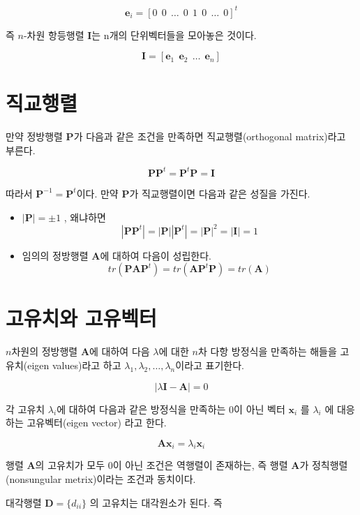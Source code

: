 \documentclass[
]{book}
\theoremstyle{definition}
\theoremstyle{definition}
\theoremstyle{definition}
\theoremstyle{remark}
\begin{document}
\[ \bm e_i = [0 ~~0 ~~\dots~~ 0 ~~ 1 ~~ 0 ~~ \dots ~~ 0 ]^t \]

즉 \(n\)-차원 항등행렬 \(\bm I\)는 n개의 단위벡터들을 모아놓은 것이다.

\[  \bm I = [ \bm e_1 ~~ \bm e_2 ~~ \dots ~~ \bm e_n ] \]

\hypertarget{uxc9c1uxad50uxd589uxb82c}{%
\section{직교행렬}\label{uxc9c1uxad50uxd589uxb82c}}

만약 정방행렬 \(\bm P\)가 다음과 같은 조건을 만족하면 직교행렬(orthogonal matrix)라고 부른다.

\[  \bm P \bm P^t = \bm P^t \bm P = \bm I \]

따라서 \(\bm P^{-1} = \bm P^t\)이다. 만약 \(\bm P\)가 직교행렬이면 다음과 같은 성질을 가진다.

\begin{itemize}
\item
  \(| \bm P | = \pm 1\) , 왜냐하면
  \[  | \bm P \bm P^t | = | \bm P | |\bm P^t |  = | \bm P|^2 = |\bm I| =1 \]
\item
  임의의 정방행렬 \(\bm A\)에 대하여 다음이 성립한다.
  \[ tr(\bm P \bm A \bm P^t) = tr(\bm A \bm P^t \bm P) = tr(\bm A) \]
\end{itemize}

\hypertarget{uxace0uxc720uxce58uxc640-uxace0uxc720uxbca1uxd130}{%
\section{고유치와 고유벡터}\label{uxace0uxc720uxce58uxc640-uxace0uxc720uxbca1uxd130}}

\(n\)차원의 정방행렬 \(\bm A\)에 대하여 다음 \(\lambda\)에 대한 \(n\)차 다항 방정식을 만족하는 해들을 고유치(eigen values)라고 하고 \(\lambda_1, \lambda_2, \dots , \lambda_n\)이라고 표기한다.

\[ | \lambda \bm I - \bm A | = 0 \]

각 고유치 \(\lambda_i\)에 대하여 다음과 같은 방정식을 만족하는 0이 아닌 벡터 \(\bm x_i\) 를 \(\lambda_i\) 에 대응하는 고유벡터(eigen vector) 라고 한다.

\[ \bm A \bm x_i = \lambda_i \bm x_i \]

행렬 \(\bm A\)의 고유치가 모두 0이 아닌 조건은 역행렬이 존재하는, 즉 행렬 \(\bm A\)가 정칙행렬(nonsungular metrix)이라는 조건과 동치이다.

대각행렬 \(\bm D = \{ d_{ii} \}\) 의 고유치는 대각원소가 된다. 즉
\end{document}
